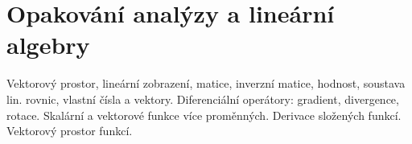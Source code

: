 \section{Opakování analýzy a lineární algebry}
Vektorový prostor, lineární zobrazení, matice, inverzní matice, hodnost, soustava lin. rovnic, vlastní čísla a vektory. 
Diferenciální operátory: gradient, divergence, rotace. 
Skalární a vektorové funkce více proměnných. 
Derivace složených funkcí. Vektorový prostor funkcí.